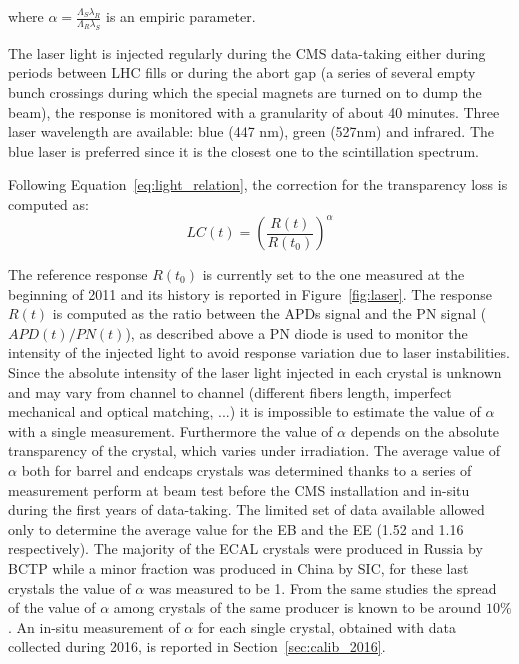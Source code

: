 where $\alpha = \frac{\Lambda_S \lambda_R}{\Lambda_R \lambda_S}$ is an empiric parameter.

The laser light is injected regularly during the CMS data-taking either during periods between LHC fills or
during the abort gap (a series of several empty bunch crossings during which the special magnets 
are turned on to dump the beam), the response is monitored with a granularity of about 40 minutes.
Three laser wavelength are available: blue (447 nm), green (527nm) and infrared. The blue laser is
preferred since it is the closest one to the scintillation spectrum.

Following Equation~\ref{eq:light_relation}, the correction for the transparency loss is computed as:
\[
  LC(t) = \left(\frac{R(t)}{R(t_0)}\right)^{\alpha}
\]

The reference response $R(t_0)$  is currently set to the one measured at the beginning of 2011 and its history is
reported in Figure~\ref{fig:laser}.
The response $R(t)$ is computed as the ratio between the APDs signal and the PN signal ($APD(t)/PN(t)$), as described above
a PN diode is used to monitor the intensity of the injected light to avoid response variation due to laser instabilities.
Since the absolute intensity of the laser light injected in each crystal is unknown and may vary from channel to channel
(different fibers length, imperfect mechanical and optical matching, ...) it is impossible to estimate the value of $\alpha$
with a single measurement. Furthermore the value of $\alpha$ depends on the absolute transparency of the crystal, which
varies under irradiation.
The average value of $\alpha$ both for barrel and endcaps crystals was determined thanks to a series of measurement perform
at beam test before the CMS installation and in-situ during the first years of data-taking. The limited set of data available
allowed only to determine the average value for the EB and the EE (1.52 and 1.16 respectively).
The majority of the ECAL crystals were produced in
Russia by BCTP while a minor fraction was produced in China by SIC, for these last crystals the value of $\alpha$ was
measured to be 1. From the same studies the spread of the value of $\alpha$ among crystals of the same producer
is known to be around $10\%$. 
An in-situ measurement of $\alpha$ for each single crystal, obtained with data collected during 2016,
is reported in Section~\ref{sec:calib_2016}.


